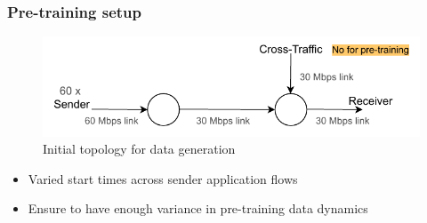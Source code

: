 \documentclass{beamer}
\begin{document}
\begin{frame}
\frametitle{Pre-training setup}


\begin{figure}[h]
  \begin{center}
    \includegraphics[scale=0.8]{figures/simple_topo.pdf}
    \caption{Initial topology for data generation}
    \label{fig:topo}
  \end{center}
\end{figure}
 
 \pause

\begin{itemize}
    \item<1-> Varied start times across sender application flows
    \item<1-> Ensure to have enough variance in pre-training data dynamics 
    \end{itemize}

\end{frame}
\end{document}
